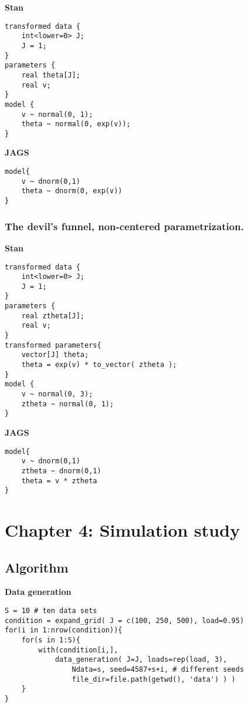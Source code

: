 \noindent \textbf{Stan}
%
\begin{lstlisting}
transformed data {
	int<lower=0> J;
	J = 1;
}
parameters {
	real theta[J];
	real v;
}
model {
	v ~ normal(0, 1);
	theta ~ normal(0, exp(v));
}
\end{lstlisting}


\noindent \textbf{JAGS}
%
\begin{lstlisting}
model{
	v ~ dnorm(0,1)
	theta ~ dnorm(0, exp(v))
}
\end{lstlisting}



\subsubsection{The devil's funnel, non-centered parametrization.}

\noindent \textbf{Stan}
%
\begin{lstlisting}
transformed data {
	int<lower=0> J;
	J = 1;
}
parameters {
	real ztheta[J];
	real v;
}
transformed parameters{
	vector[J] theta;
	theta = exp(v) * to_vector( ztheta );
}
model {
	v ~ normal(0, 3);
	ztheta ~ normal(0, 1);
}
\end{lstlisting}


\noindent \textbf{JAGS}
%
\begin{lstlisting}
model{
	v ~ dnorm(0,1)
	ztheta ~ dnorm(0,1)
	theta = v * ztheta
}
\end{lstlisting}




\section{Chapter 4: Simulation study} \label{appC2:chapter4}

\subsection{Algorithm} \label{appC2_1:sim}

\noindent \textbf{Data generation}
%
\begin{lstlisting}
S = 10 # ten data sets
condition = expand_grid( J = c(100, 250, 500), load=0.95)
for(i in 1:nrow(condition)){
	for(s in 1:S){
		with(condition[i,],
			data_generation( J=J, loads=rep(load, 3), 
				Ndata=s, seed=4587+s+i, # different seeds
				file_dir=file.path(getwd(), 'data') ) )
	}
}
\end{lstlisting}


